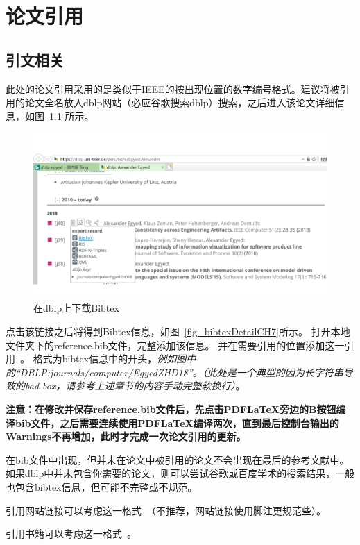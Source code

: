 \chapter{论文引用}

\section{引文相关}
此处的论文引用采用的是类似于IEEE的按出现位置的数字编号格式。建议将被引用的论文全名放入dblp网站（必应谷歌搜索dblp）搜索，之后进入该论文详细信息，如图~\ref{fig_dblpForBibtexCH7} 所示。

\begin{figure}[htb]
  \centering
  \includegraphics[width=5in]{FIGs/chapter7/dblpForBibtex.pdf}
  \caption{在dblp上下载Bibtex}\label{fig_dblpForBibtexCH7}
\end{figure}

点击该链接之后将得到Bibtex信息，如图~\ref{fig_bibtexDetailCH7}所示。
打开本地文件夹下的reference.bib文件，完整添加该信息。
并在需要引用的位置添加这一引用~\cite{DBLP:journals/computer/EgyedZHD18}。
格式为bibtex信息中的开头，\emph{例如图中的“DBLP:journals/computer/EgyedZHD18”。（此处是一个典型的因为长字符串导致的bad box，请参考上述章节的内容手动完整软换行）}。

\textbf{注意：在修改并保存reference.bib文件后，先点击PDFLaTeX旁边的B按钮编译bib文件，之后需要连续使用PDFLaTeX编译两次，直到最后控制台输出的Warnings不再增加，此时才完成一次论文引用的更新。}

在bib文件中出现，但并未在论文中被引用的论文不会出现在最后的参考文献中。如果dblp中并未包含你需要的论文，则可以尝试谷歌或百度学术的搜索结果，一般也包含bibtex信息，但可能不完整或不规范。

引用网站链接可以考虑这一格式~\cite{GanttSystem}（不推荐，网站链接使用脚注更规范些）。

引用书籍可以考虑这一格式~\cite{Pohl2010Requirements}。

